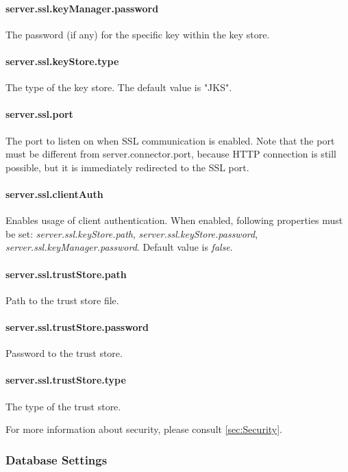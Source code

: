 \paragraph{server.ssl.keyManager.password}
The password (if any) for the specific key within the key store.

\paragraph{server.ssl.keyStore.type}
The type of the key store. The default value is "JKS".

\paragraph{server.ssl.port}
The port to listen on when SSL communication is enabled. Note that the port must
be different from server.connector.port, because HTTP connection is still possible,
but it is immediately redirected to the SSL port.

\paragraph{server.ssl.clientAuth}
Enables usage of client authentication. When enabled, following properties must
be set: \emph{server.ssl.keyStore.path}, \emph{server.ssl.keyStore.password},
\emph{server.ssl.keyManager.password}. Default value is \emph{false}.

\paragraph{server.ssl.trustStore.path}
Path to the trust store file.

\paragraph{server.ssl.trustStore.password}
Password to the trust store.

\paragraph{server.ssl.trustStore.type}
The type of the trust store.

\vspace{0.75cm}
For more information about security, please consult \ref{sec:Security}.

\subsubsection{Database Settings}
\label{sssec:DataSettings}

